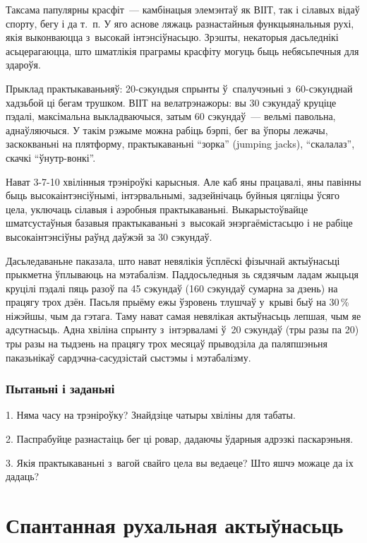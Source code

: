 Таксама папулярны красфіт~--- камбінацыя элемэнтаў як ВІІТ, так і сілавых відаў спорту, бегу і да т.~п. У яго аснове ляжаць разнастайныя функцыянальныя рухі, якія выконваюцца з~высокай інтэнсіўнасьцю. Зрэшты, некаторыя дасьледнікі асьцерагаюцца, што шматлікія праграмы красфіту могуць быць небясьпечныя для здароўя.

Прыклад практыкаваньняў: 20-сэкундыя спрынты ў~спалучэньні з~60-сэкунднай хадзьбой ці бегам трушком. ВІІТ на велатрэнажоры: вы 30 сэкундаў круціце пэдалі, максімальна выкладваючыся, затым 60 сэкундаў~--- вельмі павольна, аднаўляючыся. У такім рэжыме можна рабіць бэрпі, бег ва ўпоры лежачы, заскокваньні на плятформу, практыкаваньні ``зорка'' (jumping jacks), ``скалалаз'', скачкі ``ўнутр-вонкі''.

Нават 3-7-10 хвілінныя трэніроўкі карысныя. Але каб яны працавалі, яны павінны быць высокаінтэнсіўнымі, інтэрвальнымі, задзейнічаць буйныя цягліцы ўсяго цела, уключаць сілавыя і аэробныя практыкаваньні. Выкарыстоўвайце шматсустаўныя базавыя практыкаваньні з~высокай энэргаёмістасьцю і не рабіце высокаінтэнсіўны раўнд даўжэй за 30 сэкундаў. 

Дасьледаваньне паказала, што нават невялікія ўсплёскі фізычнай актыўнасьці прыкметна ўплываюць на мэтабалізм. Паддосьледныя зь сядзячым ладам жыцьця круцілі пэдалі пяць разоў па 45 сэкундаў (160 сэкундаў сумарна за дзень) на працягу трох дзён. Пасьля прыёму ежы ўзровень тлушчаў у~крыві быў на 30\,\% ніжэйшы, чым да гэтага. Таму нават самая невялікая актыўнасьць лепшая, чым яе адсутнасьць. Адна хвіліна спрынту з~інтэрваламі ў~20 сэкундаў (тры разы па 20) тры разы на тыдзень на працягу трох месяцаў прыводзіла да паляпшэньня паказьнікаў сардэчна-сасудзістай сыстэмы і мэтабалізму.

\subsubsection{Пытаньні і заданьні}

1. Няма часу на трэніроўку? Знайдзіце чатыры хвіліны для табаты.

2. Паспрабуйце разнастаіць бег ці ровар, дадаючы ўдарныя адрэзкі паскарэньня.

3. Якія практыкаваньні з~вагой свайго цела вы ведаеце? Што яшчэ можаце да іх дадаць?


\section{Спантанная рухальная актыўнасьць}

